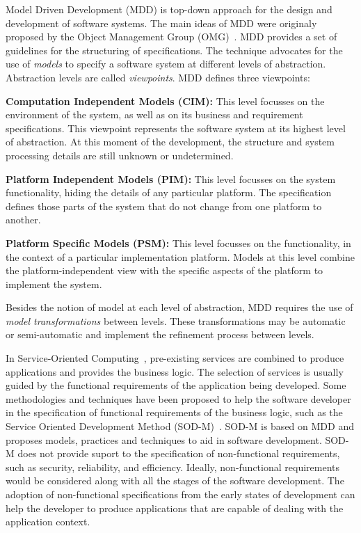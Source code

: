 Model Driven Development (MDD) is top-down approach for the design and development of software systems. 
The main ideas of MDD were originaly proposed by the Object Management Group
(OMG)~\cite{mda}. 
MDD provides a set of
guidelines for the structuring of specifications.
The technique advocates for the use of \textit{models} to specify a software system at different levels of abstraction.
Abstraction levels are called \textit{viewpoints}. 
MDD defines three viewpoints:

\begin{trivlist}
\item \textbf{Computation Independent Models (CIM):} This level focusses on the
environment of the system, as well as on its business and requirement specifications. 
This viewpoint represents the software system at its highest level of abstraction. 
At this moment of the development, the structure and system processing details are still unknown or undetermined. 
 
\item \textbf{Platform Independent Models (PIM):} This level focusses on the system functionality, hiding the details of any particular platform. 
The specification defines those parts of the system that do not change from one platform to another. 

\item \textbf{Platform Specific Models (PSM):} This level focusses on the functionality, in the context of a particular implementation platform.
Models at this level combine the platform-independent view with the specific aspects of the platform to implement the system.  
\end{trivlist}

Besides the notion of model at each level of abstraction, MDD requires the use of \textit{model transformations} between levels.
These transformations may be automatic or semi-automatic and implement the refinement process between levels.

\bigskip 

In Service-Oriented Computing~\cite{Papazoglou2007}, pre-existing services are
combined to produce applications and provides the business logic. The selection of services is usually guided by the functional requirements of the application being developed. 
Some methodologies and techniques have been proposed to help the software
developer in the specification of functional requirements of the business logic,
such as the Service Oriented Development Method
(SOD-M)~\cite{decastro1}. 
SOD-M is based on MDD and proposes
models, practices and techniques to aid in software development. SOD-M does not
provide suport to the specification of non-functional requirements, such as
security, reliability, and efficiency. Ideally, non-functional requirements
would be considered along with all the stages of the software development. The
adoption of non-functional specifications from the early states of development
can help the developer to produce applications that are capable of dealing with
the application context.

